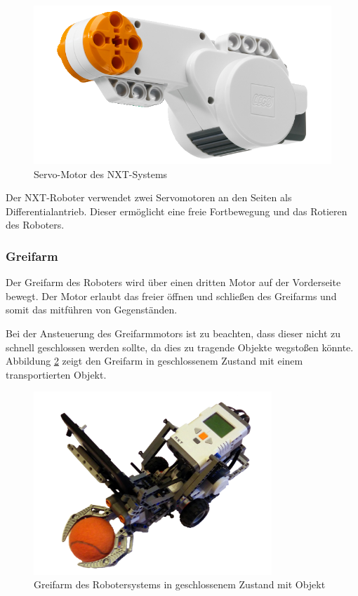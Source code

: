 \begin{figure}[h]
\centering
\includegraphics[width=\textwidth/3]{Bilder/Robot/motor}
\caption{Servo-Motor des NXT-Systems}
\label{fig:motor}
\end{figure}

Der NXT-Roboter verwendet zwei Servomotoren an den Seiten als Differentialantrieb. Dieser ermöglicht eine freie Fortbewegung und das Rotieren des Roboters. 

\subsubsection{Greifarm}
\label{sec:Greifarm}
Der Greifarm des Roboters wird über einen dritten Motor auf der Vorderseite bewegt. Der Motor erlaubt das freier öffnen und schließen des Greifarms und somit das mitführen von Gegenständen. 

Bei der Ansteuerung des Greifarmmotors ist zu beachten, dass dieser nicht zu schnell geschlossen werden sollte, da dies zu tragende Objekte wegstoßen könnte. Abbildung \ref{fig:Greifarm} zeigt den Greifarm in geschlossenem Zustand mit einem transportierten Objekt.

\begin{figure}[h]
\centering
\includegraphics[width=0.8\textwidth]{Bilder/Robot/cleenr_with_object}
\caption[Greifarm des Robotersystems]{Greifarm des Robotersystems in geschlossenem Zustand mit Objekt}
\label{fig:Greifarm}
\end{figure}

